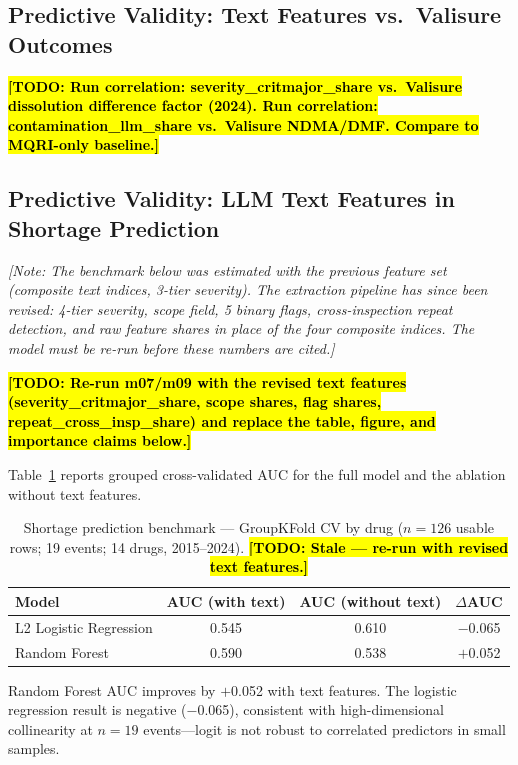 \documentclass[12pt]{article}
\newcommand{\todo}[1]{\hl{\textbf{[TODO: #1]}}}
\newcommand{\note}[1]{{\color{blue}\textit{[Note: #1]}}}
\begin{document}
\subsection{Predictive Validity: Text Features vs.\ Valisure Outcomes}

\todo{Run correlation: severity\_critmajor\_share vs.\ Valisure dissolution
difference factor (2024).
Run correlation: contamination\_llm\_share vs.\ Valisure NDMA/DMF.
Compare to MQRI-only baseline.}

\subsection{Predictive Validity: LLM Text Features in Shortage Prediction}

\note{The benchmark below was estimated with the previous feature set
(composite text indices, 3-tier severity). The extraction pipeline has since
been revised: 4-tier severity, scope field, 5 binary flags, cross-inspection
repeat detection, and raw feature shares in place of the four composite
indices. The model must be re-run before these numbers are cited.}

\todo{Re-run m07/m09 with the revised text features
(severity\_critmajor\_share, scope shares, flag shares,
repeat\_cross\_insp\_share) and replace the table, figure, and importance
claims below.}

Table~\ref{tab:model} reports grouped cross-validated AUC for the full model
and the ablation without text features.

\begin{table}[h!]
\centering
\caption{Shortage prediction benchmark — GroupKFold CV by drug
         ($n=126$ usable rows; 19 events; 14 drugs, 2015--2024).
         \todo{Stale — re-run with revised text features.}}
\label{tab:model}
\begin{tabular}{lccc}
\toprule
\textbf{Model} & \textbf{AUC (with text)} & \textbf{AUC (without text)} & \textbf{$\Delta$AUC} \\
\midrule
L2 Logistic Regression & 0.545 & 0.610 & $-$0.065 \\
Random Forest          & 0.590 & 0.538 & $+$0.052 \\
\bottomrule
\end{tabular}
\end{table}

Random Forest AUC improves by $+$0.052 with text features.
The logistic regression result is negative ($-$0.065), consistent with
high-dimensional collinearity at $n = 19$ events---logit is not robust
to correlated predictors in small samples.
\end{document}
